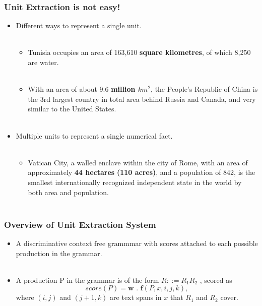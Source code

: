 \documentclass{beamer}
\begin{document}
\begin{frame}
 \frametitle{Unit Extraction is not easy!} \pause
 
 \begin{itemize}
    \item Different ways to represent a single unit. \pause \\~\\
    
    \begin{itemize}
     \item Tunisia occupies an area of 163,610 \textbf{square kilometres}, of which 8,250 are water. \pause \\~\\
     \item With an area of about 9.6 \textbf{million $km^{2}$}, the People's Republic of China is the 3rd largest country in total area behind Russia and Canada, and very similar to the United States. \\~\\
    \end{itemize}
\pause
    
    \item Multiple units to represent a single numerical fact. \pause \\~\\
    \begin{itemize}
      \item Vatican City, a walled enclave within the city of Rome, with an area of approximately \textbf{44 hectares} \textbf{(110 acres)}, and a population of 842, is the smallest internationally recognized independent state in the world by both area and population. \\~\\
    \end{itemize}
 \end{itemize}
\end{frame}


\begin{frame}
 \frametitle{Overview of Unit Extraction System} \pause
 
 \begin{itemize}
  
  \item A discriminative context free grammmar with scores
attached to each possible production in the grammar. \pause \\~\\ 
  \item A production P in the grammar is of the form  $ R ::= R_{1} R_{2}$ , scored as 
\begin{equation*}
	score(P) = \textbf{w . f}(P, x, i, j, k), 
\end{equation*}
where $(i,j)$ and $(j+1,k)$ are text spans in $x$ that $R_{1}$ and $R_{2}$
cover.
 \end{itemize}
\end{frame}
\end{document}
